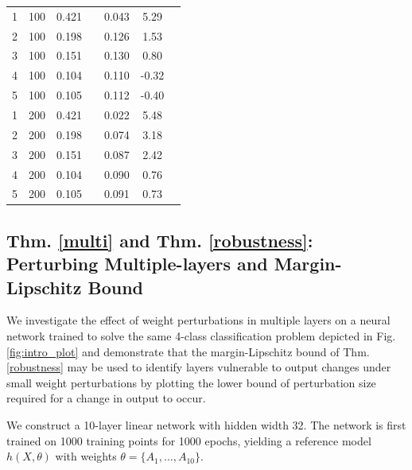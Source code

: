 \documentclass{article}
\newcommand{\cmark}{\textcolor{green!60!black}{\ding{51}}}
\newcommand{\xmark}{\textcolor{red!60!black}{\ding{55}}}
\newcommand{\good}{\cellcolor{green!15}\makebox[1.0em][c]{\cmark}}
\newcommand{\bad}{\cellcolor{red!15}\makebox[1.0em][c]{\xmark}}
\theoremstyle{plain}
\theoremstyle{definition}
\theoremstyle{remark}
\begin{document}
\begin{table}[!b]
\begin{scriptsize}
\begin{sc}
\begin{tabular}{@{} c c c c c c c @{}}
\rowcolor{tableShade}
1 & 100 & 0.421 & \good & 0.043 & 5.29 & \bad \\
\rowcolor{tableShade}
2 & 100 & 0.198 & \good & 0.126 & 1.53 & \bad \\
\rowcolor{tableShade}
3 & 100 & 0.151 & \good & 0.130 & 0.80 & \bad \\
\rowcolor{tableShade}
4 & 100 & 0.104 & \good & 0.110 & -0.32 & \good \\
\rowcolor{tableShade}
5 & 100 & 0.105 & \good & 0.112 & -0.40 & \good \\
1 & 200 & 0.421 & \good & 0.022 & 5.48 & \bad \\
2 & 200 & 0.198 & \good & 0.074 & 3.18 & \bad \\
3 & 200 & 0.151 & \good & 0.087 & 2.42 & \bad \\
4 & 200 & 0.104 & \good & 0.090 & 0.76 & \bad \\
5 & 200 & 0.105 & \good & 0.091 & 0.73 & \bad \\
\bottomrule
\end{tabular}
\end{sc}
\end{scriptsize}
\vskip -0.05in
\end{table}


\subsection{Thm. \ref{multi} and Thm. \ref{robustness}: Perturbing Multiple-layers and Margin-Lipschitz Bound}\label{multi_exp}
We investigate the effect of weight perturbations in multiple layers on a neural network trained to solve the same 4-class classification problem depicted in Fig. \ref{fig:intro_plot} and demonstrate that the margin-Lipschitz bound of Thm. \ref{robustness} may be used to identify layers vulnerable to output changes under small weight perturbations by plotting the lower bound of perturbation size required for a change in output to occur. 

 We construct a 10-layer linear network with hidden width 32. The network is first trained on 1000 training points for 1000 epochs, yielding a reference model \( h(X, \theta) \) with  weights \( \theta = \{ A_1, \ldots, A_{10} \} \). 
 
\end{document}
